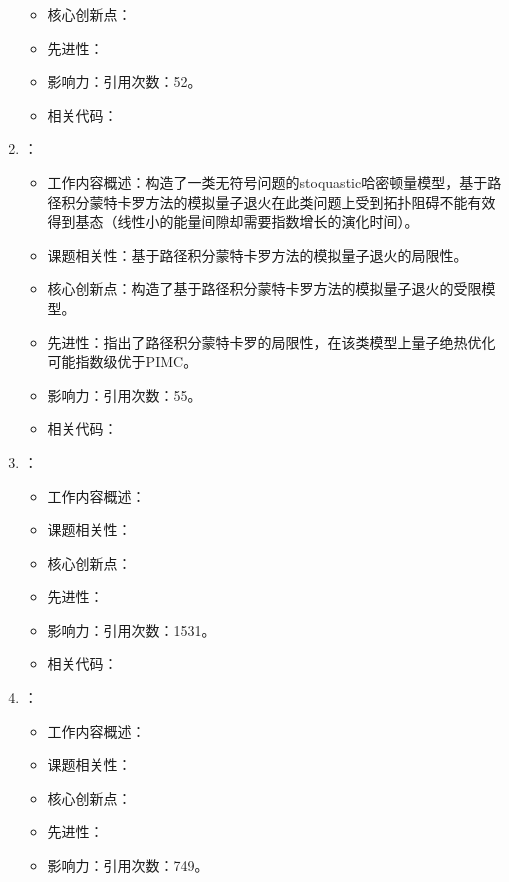 \begin{enumerate}
\begin{itemize}
                \item 核心创新点：
                \item 先进性：
                \item 影响力：引用次数：52。
                \item 相关代码：
            \end{itemize}
            \item \citet{hastings2013obstructions}：
            \begin{itemize}
                \item 工作内容概述：构造了一类无符号问题的stoquastic哈密顿量模型，基于路径积分蒙特卡罗方法的模拟量子退火在此类问题上受到拓扑阻碍不能有效得到基态（线性小的能量间隙却需要指数增长的演化时间）。
                \item 课题相关性：基于路径积分蒙特卡罗方法的模拟量子退火的局限性。
                \item 核心创新点：构造了基于路径积分蒙特卡罗方法的模拟量子退火的受限模型。
                \item 先进性：指出了路径积分蒙特卡罗的局限性，在该类模型上量子绝热优化可能指数级优于PIMC。
                \item 影响力：引用次数：55。
                \item 相关代码：
            \end{itemize}
            \item \citet{farhi2014quantum}：
            \begin{itemize}
                \item 工作内容概述：
                \item 课题相关性：
                \item 核心创新点：
                \item 先进性：
                \item 影响力：引用次数：1531。
                \item 相关代码：
            \end{itemize}
            \item \citet{boixo2014evidence}：
            \begin{itemize}
                \item 工作内容概述：
                \item 课题相关性：
                \item 核心创新点：
                \item 先进性：
                \item 影响力：引用次数：749。

\end{itemize}
\end{enumerate}
